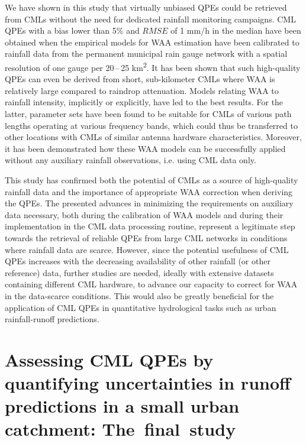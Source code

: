 \documentclass{ctuthesis}\usepackage[]{graphicx}\usepackage[]{color}
\begin{document}
We have shown in this study that virtually unbiased QPEs could be retrieved from CMLs without the need for dedicated rainfall monitoring campaigns. CML QPEs with a bias lower than 5\% and $R\!M\!S\!E$ of 1 mm/h in the median have been obtained when the empirical models for WAA estimation have been calibrated to rainfall data from the permanent municipal rain gauge network with a spatial resolution of one gauge per 20\,--\,25 km\textsuperscript{2}. It has been shown that such high-quality QPEs can even be derived from short, sub-kilometer CMLs where WAA is relatively large compared to raindrop attenuation. Models relating WAA to rainfall intensity, implicitly or explicitly, have led to the best results. For the latter, parameter sets have been found to be suitable for CMLs of various path lengths operating at various frequency bands, which could thus be transferred to other locations with CMLs of similar antenna hardware characteristics. Moreover, it has been demonstrated how these WAA models can be successfully applied without any auxiliary rainfall observations, i.e. using CML data only.

This study has confirmed both the potential of CMLs as a source of high-quality rainfall data and the importance of appropriate WAA correction when deriving the QPEs. The presented advances in minimizing the requirements on auxiliary data necessary, both during the calibration of WAA models and during their implementation in the CML data processing routine, represent a legitimate step towards the retrieval of reliable QPEs from large CML networks in conditions where rainfall data are scarce. However, since the potential usefulness of CML QPEs increases with the decreasing availability of other rainfall (or other reference) data, further studies are needed, ideally with extensive datasets containing different CML hardware, to advance our capacity to correct for WAA in the data-scarce conditions. This would also be greatly beneficial for the application of CML QPEs in quantitative hydrological tasks such as urban rainfall-runoff predictions.




        


\chapter{Assessing CML QPEs by quantifying uncertainties in runoff predictions in a small urban catchment: The~final~study} \label{chap7}
\end{document}
